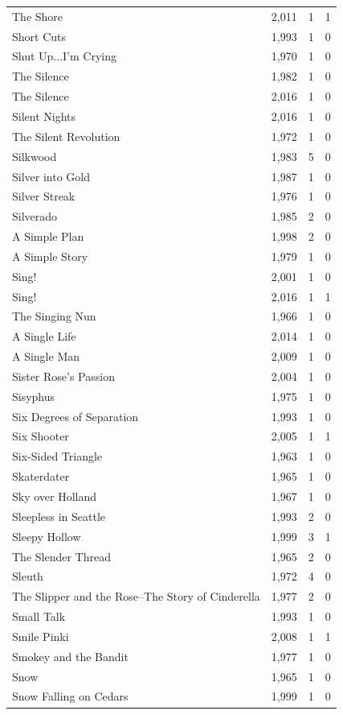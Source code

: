 \begin{tabular}{lrrr}
The Shore & 2,011 & 1 & 1 \\
Short Cuts & 1,993 & 1 & 0 \\
Shut Up...I'm Crying & 1,970 & 1 & 0 \\
The Silence & 1,982 & 1 & 0 \\
The Silence & 2,016 & 1 & 0 \\
Silent Nights & 2,016 & 1 & 0 \\
The Silent Revolution & 1,972 & 1 & 0 \\
Silkwood & 1,983 & 5 & 0 \\
Silver into Gold & 1,987 & 1 & 0 \\
Silver Streak & 1,976 & 1 & 0 \\
Silverado & 1,985 & 2 & 0 \\
A Simple Plan & 1,998 & 2 & 0 \\
A Simple Story & 1,979 & 1 & 0 \\
Sing! & 2,001 & 1 & 0 \\
Sing! & 2,016 & 1 & 1 \\
The Singing Nun & 1,966 & 1 & 0 \\
A Single Life & 2,014 & 1 & 0 \\
A Single Man & 2,009 & 1 & 0 \\
Sister Rose's Passion & 2,004 & 1 & 0 \\
Sisyphus & 1,975 & 1 & 0 \\
Six Degrees of Separation & 1,993 & 1 & 0 \\
Six Shooter & 2,005 & 1 & 1 \\
Six-Sided Triangle & 1,963 & 1 & 0 \\
Skaterdater & 1,965 & 1 & 0 \\
Sky over Holland & 1,967 & 1 & 0 \\
Sleepless in Seattle & 1,993 & 2 & 0 \\
Sleepy Hollow & 1,999 & 3 & 1 \\
The Slender Thread & 1,965 & 2 & 0 \\
Sleuth & 1,972 & 4 & 0 \\
The Slipper and the Rose--The Story of Cinderella & 1,977 & 2 & 0 \\
Small Talk & 1,993 & 1 & 0 \\
Smile Pinki & 2,008 & 1 & 1 \\
Smokey and the Bandit & 1,977 & 1 & 0 \\
Snow & 1,965 & 1 & 0 \\
Snow Falling on Cedars & 1,999 & 1 & 0 \\

\end{tabular}
